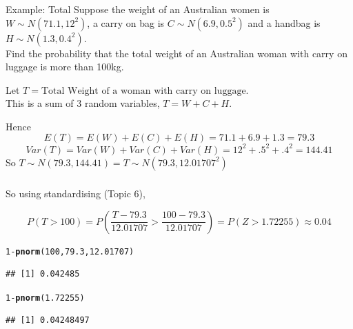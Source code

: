 \documentclass[t,xcolor=pdftex,dvipsnames,table]{beamer}
\makeatletter
\newcommand{\hlnum}[1]{\textcolor[rgb]{0.686,0.059,0.569}{#1}}%
\newcommand{\hlopt}[1]{\textcolor[rgb]{0,0,0}{#1}}%
\newcommand{\hlstd}[1]{\textcolor[rgb]{0.345,0.345,0.345}{#1}}%
\newcommand{\hlkwd}[1]{\textcolor[rgb]{0.737,0.353,0.396}{\textbf{#1}}}%
\newenvironment{kframe}{%
 \def\at@end@of@kframe{}%
 \ifinner\ifhmode%
  \def\at@end@of@kframe{\end{minipage}}%
  \begin{minipage}{\columnwidth}%
 \fi\fi%
 \def\FrameCommand##1{\hskip\@totalleftmargin \hskip-\fboxsep
 \colorbox{shadecolor}{##1}\hskip-\fboxsep
     \hskip-\linewidth \hskip-\@totalleftmargin \hskip\columnwidth}%
 \MakeFramed {\advance\hsize-\width
   \@totalleftmargin\z@ \linewidth\hsize
   \@setminipage}}%
 {\par\unskip\endMakeFramed%
 \at@end@of@kframe}
\newenvironment{knitrout}{}{} %
\makeatother
\begin{document}
\begin{frame}[fragile]\frametitle{}

\begin{block}{Example: Total}
Suppose the weight of an Australian women is $W \sim N(71.1, 12^2)$, a carry on bag is $C \sim N(6.9,0.5^2)$ and a handbag is $H \sim N(1.3, 0.4^2)$.
\href{http://www.qantas.com./travel/airlines/carry-on-baggage/global/en#carry-on-baggage-allowances}{} \\

Find the probability that the total weight of an Australian woman with carry on luggage is more than 100kg.
\end{block}

\vspace{.5cm}
Let $T = \mbox{Total Weight of a woman with carry on luggage}$. \\

This is a sum of 3 random variables, $T = W + C + H$.

Hence 
\[ E(T) = E(W) + E(C) + E(H) = 71.1 + 6.9 + 1.3 = 79.3 \]
\[ Var(T) =  Var(W) + Var(C) + Var(H) = 12^2 + .5^2 + .4^2 = 144.41 \]
So $T \sim N(79.3, 144.41) = T \sim N(79.3, 12.01707^2)$
\end{frame}


\begin{frame}[fragile]\frametitle{}

So using standardising (Topic 6),

\[ P(T > 100) = P(\frac{T-79.3}{12.01707} > \frac{100-79.3}{12.01707}) = P(Z > 1.72255) \approx 0.04 \]

\begin{knitrout}
\color{fgcolor}\begin{kframe}
\begin{alltt}
\hlnum{1}\hlopt{-}\hlkwd{pnorm}\hlstd{(}\hlnum{100}\hlstd{,}\hlnum{79.3}\hlstd{,}\hlnum{12.01707}\hlstd{)}
\end{alltt}
\begin{verbatim}
## [1] 0.042485
\end{verbatim}
\begin{alltt}
\hlnum{1}\hlopt{-}\hlkwd{pnorm}\hlstd{(}\hlnum{1.72255}\hlstd{)}
\end{alltt}
\begin{verbatim}
## [1] 0.04248497
\end{verbatim}
\end{kframe}
\end{knitrout}
\end{frame}
\end{document}

